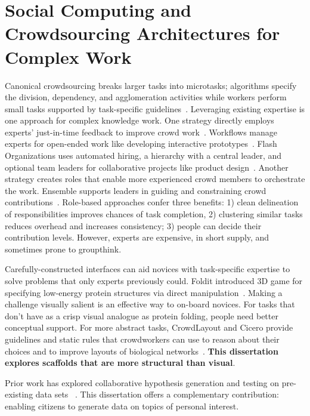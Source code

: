 
\section{Social Computing and Crowdsourcing Architectures for Complex Work}
Canonical crowdsourcing breaks larger tasks into microtasks; algorithms specify the division,
dependency, and agglomeration activities while workers perform small tasks supported by task-specific
guidelines~\cite{kittur2012future}. Leveraging existing expertise is one approach for complex knowledge work. One strategy
directly employs experts’ just-in-time feedback to improve crowd work~\cite{dow2012shepherding}. Workflows manage
experts for open-ended work like developing interactive prototypes~\cite{Retelny2014}. 
Flash Organizations uses automated hiring, a hierarchy with a central leader, and optional 
team leaders for collaborative projects like product design~\cite{Valentine2017}.
Another strategy creates roles that enable more experienced crowd members to orchestrate
the work. Ensemble supports leaders in guiding and constraining crowd 
contributions~\cite{Kim2014e}. Role-based approaches confer three benefits: 1) clean 
delineation of responsibilities improves chances of task completion, 2) clustering similar tasks 
reduces overhead and increases consistency; 3) people can decide their contribution levels. 
However, experts are expensive, in short supply, and sometimes prone to groupthink. 

Carefully-constructed interfaces can aid novices with task-specific expertise to solve problems 
that only experts previously could. Foldit introduced 3D game for specifying low-energy protein 
structures via direct manipulation~\cite{Cooper2010}. Making a challenge visually salient is an 
effective way to on-board novices. For tasks that don’t have as a crisp visual analogue as protein
folding, people need better conceptual support. For more abstract tasks, CrowdLayout and Cicero
provide guidelines and static rules that crowdworkers can use to reason about their choices and
to improve layouts of biological networks~\cite{Singh:2018:CCD:3173574.3173806, chen2019cicero}.
 \textbf{This dissertation explores scaffolds that are more structural than visual}.

Prior work has explored  collaborative hypothesis generation and testing on pre-existing data sets
~\cite{luther2009pathfinder,willett2011commentspace}. This dissertation offers a 
complementary contribution: enabling citizens to generate data on topics of personal interest. 

